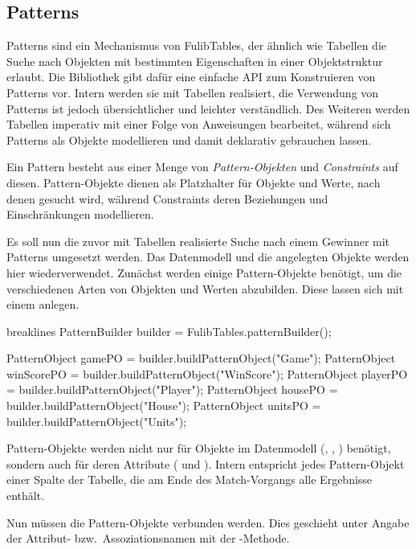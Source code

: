 \subsection{Patterns}\label{subsec:patterns}

Patterns sind ein Mechanismus von FulibTables, der ähnlich wie Tabellen die Suche nach Objekten mit bestimmten Eigenschaften in einer Objektstruktur erlaubt.
Die Bibliothek gibt dafür eine einfache API zum Konstruieren von Patterns vor.
Intern werden sie mit Tabellen realisiert, die Verwendung von Patterns ist jedoch übersichtlicher und leichter verständlich.
Des Weiteren werden Tabellen imperativ mit einer Folge von Anweisungen bearbeitet, während sich Patterns als Objekte modellieren und damit deklarativ gebrauchen lassen.

Ein Pattern besteht aus einer Menge von \emph{Pattern-Objekten} und \emph{Constraints} auf diesen.
Pattern-Objekte dienen als Platzhalter für Objekte und Werte, nach denen gesucht wird, während Constraints deren Beziehungen und Einschränkungen modellieren.

Es soll nun die zuvor mit Tabellen realisierte Suche nach einem Gewinner mit Patterns umgesetzt werden.
Das Datenmodell und die angelegten Objekte werden hier wiederverwendet.
Zunächst werden einige Pattern-Objekte benötigt, um die verschiedenen Arten von Objekten und Werten abzubilden.
Diese lassen sich mit einem  anlegen.

\begin{jcodeblock*}{breaklines}
    PatternBuilder builder = FulibTables.patternBuilder();

    PatternObject gamePO = builder.buildPatternObject("Game");
    PatternObject winScorePO = builder.buildPatternObject("WinScore");
    PatternObject playerPO = builder.buildPatternObject("Player");
    PatternObject housePO = builder.buildPatternObject("House");
    PatternObject unitsPO = builder.buildPatternObject("Units");
\end{jcodeblock*}

Pattern-Objekte werden nicht nur für Objekte im Datenmodell (, , ) benötigt, sondern auch für deren Attribute ( und ).
Intern entspricht jedes Pattern-Objekt einer Spalte der Tabelle, die am Ende des Match-Vorgangs alle Ergebnisse enthält.

Nun müssen die Pattern-Objekte verbunden werden.
Dies geschieht unter Angabe der Attribut- bzw.\ Assoziationsnamen mit der -Methode.


